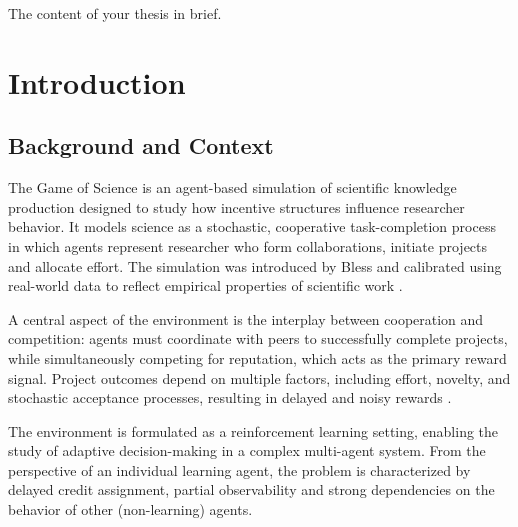 \documentclass[english,bachelor]{hsluthesis}
\begin{document}
\begin{abstractstyle}{\hsummary}
    The content of your thesis in brief.
\end{abstractstyle}

\tableofcontents
\listoffigures
\listoftables
\printnoidxglossaries



\mainmatter

\chapter{Introduction}

\section{Background and Context}
The Game of Science is an agent-based simulation of scientific knowledge production designed to study how incentive structures influence researcher behavior. It models science as a stochastic, cooperative task-completion process in which agents represent researcher who form collaborations, initiate projects and allocate effort. 
The simulation was introduced by Bless and calibrated using real-world data to reflect empirical properties of scientific work \cite{bless_game_of_science_2026}. 

A central aspect of the environment is the interplay between cooperation and competition: agents must coordinate with peers to successfully complete projects, while simultaneously competing for reputation, which acts as the primary reward signal. Project outcomes depend on multiple factors, including effort, novelty, and stochastic acceptance processes, resulting in delayed and noisy rewards \cite{bless_game_of_science_2026}.

The environment is formulated as a reinforcement learning setting, enabling the study of adaptive decision-making in a complex multi-agent system. From the perspective of an individual learning agent, the problem is characterized by delayed credit assignment, partial observability and strong dependencies on the behavior of other (non-learning) agents.
\end{document}
